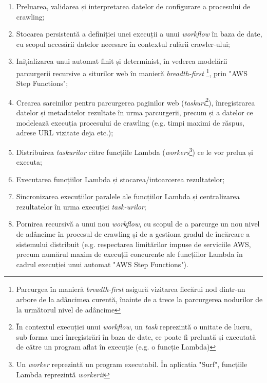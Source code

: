 \begin{enumerate}

	\item{Preluarea, validarea și interpretarea datelor de configurare a procesului de crawling;}
	
	\item{Stocarea persistentă a definiției unei execuții a unui \textit{workflow} în baza de date, cu scopul accesării datelor necesare în contextul rulării crawler-ului;}
	
	\item{Inițializarea unui automat finit și determinist, în vederea modelării parcurgerii recursive a siturilor web în manieră \textit{breadth-first} \footnote{Parcurgea în manieră \textit{breadth-first} asigură vizitarea fiecărui nod dintr-un arbore de la adâncimea curentă, înainte de a trece la parcurgerea nodurilor de la următorul nivel de adâncime}, prin "AWS Step Functions";}
	
	\item{Crearea sarcinilor pentru parcurgerea paginilor web (\textit{taskuri}\footnote{În contextul execuției unui \textit{workflow}, un \textit{task} reprezintă o unitate de lucru, sub forma unei înregistrări în baza de date, ce poate fi preluată și executată de către un program aflat în execuție (e.g. o funcție Lambda)}), înregistrarea datelor și metadatelor rezultate în urma parcurgerii, precum și a datelor ce modelează execuția procesului de crawling (e.g. timpi maximi de răspus, adrese URL vizitate deja etc.);}
	
	\item{Distribuirea \textit{taskurilor} către funcțiile Lambda (\textit{workers}\footnote{Un \textit{worker} reprezintă un program executabil. În aplicatia "Surf", funcțiile Lambda reprezintă \textit{workerii}}) ce le vor prelua și executa;}
	
	\item{Executarea funcțiilor Lambda și stocarea/intoarcerea rezultatelor;}
	
	\item{Sincronizarea execuțiilor paralele ale funcțiilor Lambda și centralizarea rezultatelor în urma execuției \textit{task-urilor};}
	
	\item{Pornirea recursivă a unui nou \textit{workflow}, cu scopul de a parcurge un nou nivel de adâncime în procesul de crawling și de a gestiona gradul de încărcare a sistemului distribuit (e.g. respectarea limitărilor impuse de serviciile AWS, precum numărul maxim de execuții concurente ale funcțiilor Lambda în cadrul execuției unui automat "AWS Step Functions").}
	
\end{enumerate} 


